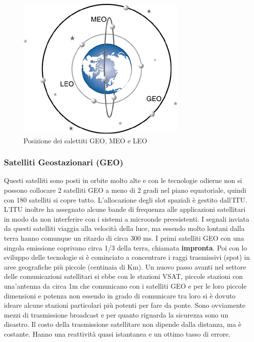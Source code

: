 \begin{figure}[htpb]
\centering
\includegraphics[scale=1]{images/Orbits.png}
\caption{Posizione dei salettiti GEO, MEO e LEO}
\end{figure}

\subsubsection{Satelliti Geostazionari (GEO)}	

Questi satelliti sono posti in orbite molto alte e con le tecnologie odierne non si possono collocare 2 satelliti GEO a meno di 2 gradi nel piano equatoriale, quindi con 180 satelliti si copre tutto. L'allocazione degli slot spaziali è gestito dall'ITU. L'ITU inoltre ha assegnato alcune bande di frequenza alle applicazioni satellitari in modo da non interferire con i sistemi a microonde preesistenti. I segnali inviata da questi satelliti viaggia alla velocità della luce, ma essendo molto lontani dalla terra hanno comunque un ritardo di circa 300 ms. I primi satelliti GEO con una singola emissione coprivano circa 1/3 della terra, chiamata \textbf{impronta}. Poi con lo sviluppo delle tecnologie si è cominciato a concentrare i raggi trasmissivi (spot) in aree geografiche più piccole (centinaia di Km). Un nuovo passo avanti nel settore delle comunicazioni satellitari si ebbe con le stazioni VSAT, piccole stazioni con una'antenna da circa 1m che comunicano con i satelliti GEO e per le loro piccole dimensioni e potenza non essendo in grado di comunicare tra loro si è dovuto ideare  alcune stazioni particolari più potenti per fare da ponte. Sono ovviamente mezzi di trasmissione broadcast e per quanto riguarda la sicurezza sono un disastro. Il costo della trasmissione satellitare non dipende dalla distanza, ma è costante. Hanno una reattività quasi istantanea e un ottimo tasso di errore.

